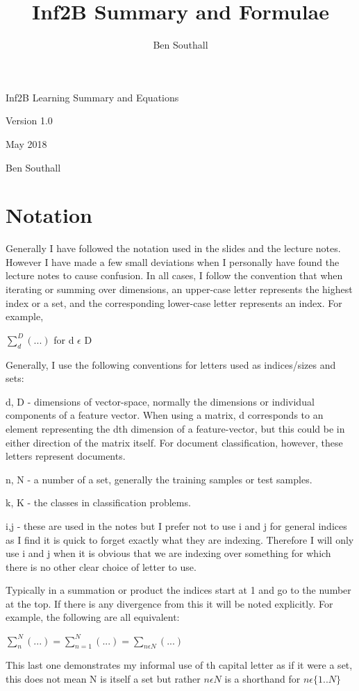 \documentclass[10pt,a4paper]{article}
\author{Ben Southall}
\title{Inf2B Summary and Formulae}
\begin{document}
	
	{\LARGE Inf2B Learning Summary and Equations}
	\begin{center}
	
	{\Large Version 1.0}

	
	{\Large May 2018}
	
	{\Large Ben Southall}
	
		\end{center}
	
	\section{Notation}
	
	Generally I have followed the notation used in the slides and the lecture notes. However I have made a few small deviations when I personally have found the lecture notes to cause confusion.
	In all cases, I follow the convention that when iterating or summing over dimensions, an upper-case letter represents the highest index or a set, and the corresponding lower-case letter represents an index. For example,
	\begin{center}
		$ \sum\limits_d^D(...) $ \qquad for d $\epsilon$ D
	\end{center}
	
	Generally, I use the following conventions for letters used as indices/sizes and sets:
	
	d, D - dimensions of vector-space, normally the dimensions or individual components of a feature vector. When using a matrix, d corresponds to an element representing the dth dimension of a feature-vector, but this could be in either direction of the matrix itself. For document classification, however, these letters represent documents.

	n, N - a number of a set, generally the training samples or test samples.

	k, K - the classes in classification problems.
	
	i,j - these are used in the notes but I prefer not to use i and j for general indices as I find it is quick to forget exactly what they are indexing. Therefore I will only use i and j when it is obvious that we are indexing over something for which there is no other clear choice of letter to use.
	
	Typically in a summation or product the indices start at 1 and go to the number at the top. If there is any divergence from this it will be noted explicitly. For example, the following are all equivalent:
	\begin{center}
		$\sum\limits_n^N(...) = \sum\limits_{n=1}^N(...) = \sum\limits_{n \epsilon N}(...) $
	\end{center}
	This last one demonstrates my informal use of th capital letter as if it were a set, this does not mean N is itself a set but rather $n \epsilon N$ is a shorthand for $n \epsilon \{1..N\}$
	
\end{document}
